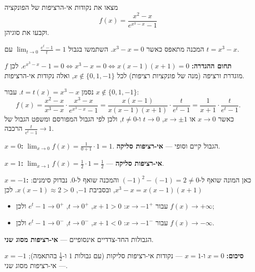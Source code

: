 
\begin{question}
מצאו את נקודות אי-הרציפות של הפונקציה
\[ f(x)=\frac{x^2-x}{e^{x^3-x}-1} \]
וקבעו את סוגיהן.
\end{question}

\begin{hint}
המכנה מתאפס כאשר $x^3-x=0$. השתמשו בגבול $\lim_{t\to0}\frac{e^t-1}{t}=1$ עם $t=x^3-x$.
\end{hint}

\begin{solution}
\textbf{תחום ההגדרה:} $e^{x^3-x}-1=0\iff x^3-x=0\iff x(x-1)(x+1)=0$. לכן $f$ מוגדרת ורציפה (מנה של פונקציות רציפות) לכל $x\notin\{0,1,-1\}$, ואלה נקודות אי-הרציפות.

נסמן $t=t(x)=x^3-x$. עבור $x\notin\{0,1,-1\}$:
\[ f(x)=\frac{x^2-x}{x^3-x}\cdot\frac{x^3-x}{e^{x^3-x}-1}=\frac{x(x-1)}{x(x-1)(x+1)}\cdot\frac{t}{e^t-1}=\frac{1}{x+1}\cdot\frac{t}{e^t-1}. \]
כאשר $x\to0$ או $x\to\pm1$, $t\to0$ ו-$t\neq0$, ולכן לפי הגבול המפורסם ומשפט הגבול של הרכבה $\frac{t}{e^t-1}\to1$.

\textbf{$x=0$:} $\lim_{x\to0}f(x)=\frac{1}{0+1}\cdot1=1$. הגבול קיים וסופי — \textbf{אי-רציפות סליקה}.

\textbf{$x=1$:} $\lim_{x\to1}f(x)=\frac{1}{2}\cdot1=\frac12$ — \textbf{אי-רציפות סליקה}.

\textbf{$x=-1$:} כאן המונה שואף ל-$(-1)^2-(-1)=2\neq0$ והמכנה שואף ל-$0$. נבדוק סימנים: $x^3-x=x(x-1)(x+1)$, ובסביבת $-1$, $x(x-1)\approx2>0$. לכן
\begin{itemize}
  \item עבור $x\to-1^+$: $x+1>0$, $t\to0^+$, $e^t-1\to0^+$ ולכן $f(x)\to+\infty$;
  \item עבור $x\to-1^-$: $x+1<0$, $t\to0^-$, $e^t-1\to0^-$ ולכן $f(x)\to-\infty$.
\end{itemize}
הגבולות החד-צדדיים אינסופיים — \textbf{אי-רציפות מסוג שני}.

\textbf{סיכום:} $x=0$ ו-$x=1$ — נקודות אי-רציפות סליקות (עם גבולות $1$ ו-$\frac12$ בהתאמה); $x=-1$ — אי-רציפות מסוג שני.
\end{solution}
